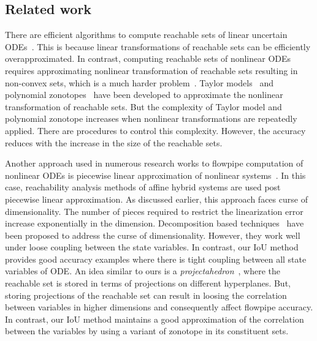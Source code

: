 \subsection{Related work}
There are efficient algorithms to compute reachable sets of linear
uncertain
ODEs~\cite{girard2005reachability,FLD+11,girard2008efficient,bak2017simulation}.
This is because linear transformations of reachable sets can be
efficiently overapproximated.  In contrast, computing reachable sets
of nonlinear ODEs requires approximating nonlinear transformation of
reachable sets resulting in non-convex sets, which is a much harder
problem~\cite{dang2009image,monniaux2011generation}.  Taylor
models~\cite{chen2012taylor} and polynomial
zonotopes~\cite{althoff2013reachability,kochdumper2020sparse,kochdumper2020constrained}
have been developed to approximate the nonlinear transformation of
reachable sets.  But the complexity of Taylor model and polynomial
zonotope increases when nonlinear transformations are repeatedly
applied.  There are procedures to control this complexity. However,
the accuracy reduces with the increase in the size of the reachable sets.

Another approach used in numerous research works to flowpipe
computation of nonlinear ODEs is piecewise linear approximation of
nonlinear
systems~\cite{althoff2008reachability,li2020reachability,dang2010accurate,ramdani2009hybrid,han2006reachability}.
In this case, reachability analysis methods of affine hybrid systems
are used post piecewise linear approximation.  As discussed earlier,
this approach faces curse of dimensionality.  The number of pieces
required to restrict the linearization error increase exponentially in
the dimension.  Decomposition based
techniques~\cite{chen2018decomposition,chen2016decomposed} have been
proposed to address the curse of dimensionality. However, they 
work well under loose coupling between the state variables.  In
contrast, our IoU method provides good accuracy examples where
there is tight coupling between all state variables of ODE.
%
An idea similar to ours is a
\emph{projectahedron}~\cite{greenstreet1999reachability}, where the reachable
set is stored in terms of projections on different hyperplanes.  But,
storing projections of the reachable set can result in loosing the
correlation between variables in higher dimensions and consequently
affect flowpipe accuracy.  In contrast, our IoU method maintains a
good approximation of the correlation between the variables by using a
variant of zonotope in its constituent sets.

